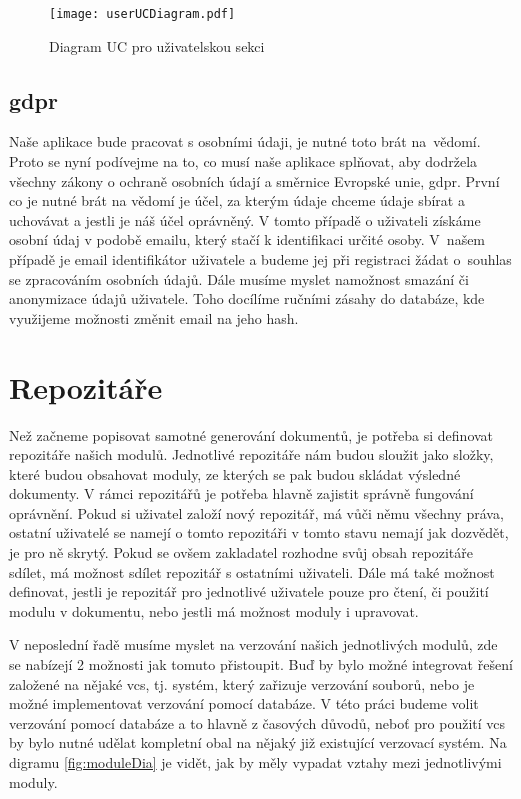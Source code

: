 \begin{figure}[h]
    \centering
    \texttt{[image: userUCDiagram.pdf]}
    \caption{Diagram UC pro uživatelskou sekci}
    \label{fig:userUCDiagram}
\end{figure}

\subsection{\gls{gdpr}}

Naše aplikace bude pracovat s osobními údaji, je nutné toto brát na~vědomí. Proto se nyní podívejme na to, co musí naše aplikace splňovat, aby dodržela všechny
zákony o ochraně osobních údají a směrnice Evropské unie, \gls{gdpr}. První co je nutné brát na vědomí je účel, za kterým údaje chceme údaje sbírat a uchovávat a jestli je náš
účel oprávněný. V tomto případě o uživateli získáme osobní údaj v podobě emailu, který stačí k identifikaci určité osoby. V~našem případě je email identifikátor uživatele
a budeme jej při registraci žádat o~\mbox{souhlas} se zpracováním osobních údajů. Dále musíme myslet na\linebreak možnost smazání či anonymizace údajů uživatele. Toho docílíme ručními
zá\-sahy do databáze, kde využijeme možnosti změnit email na jeho hash. \cite{gdpr}

\section{Repozitáře}

Než začneme popisovat samotné generování dokumentů, je potřeba si \mbox{definovat} repozitáře našich modulů. Jednotlivé repozitáře nám budou sloužit jako složky,
které budou obsahovat moduly, ze kterých se pak budou skládat výsledné dokumenty. V rámci repozitářů je potřeba hlavně zajistit správně fungování oprávnění.
Pokud si uživatel založí nový repozitář, má vůči němu všechny práva, ostatní uživatelé se namejí o tomto repozitáři v tomto stavu nemají jak dozvědět, je pro ně
skrytý. Pokud se ovšem zakladatel rozhodne svůj obsah repozitáře sdílet, má možnost sdílet repozitář s ostatními uživateli.
Dále má také možnost definovat, jestli je repozitář pro jednotlivé uživatele pouze pro čtení, či použití modulu v dokumentu,
nebo jestli má možnost moduly i upravovat.

V neposlední řadě musíme myslet na verzování našich jednotlivých modulů, zde se nabízejí 2 možnosti jak tomuto přistoupit. Buď by bylo možné integrovat
řešení založené na nějaké \gls{vcs}, tj. systém, který zařizuje verzování souborů,
nebo je možné implementovat verzování pomocí databáze. V této práci budeme volit verzování pomocí databáze a to hlavně z časových důvodů, neboť
pro použití \gls{vcs} by bylo nutné udělat kompletní obal na nějaký již existující verzovací systém. Na digramu \ref{fig:moduleDia} je vidět, jak by měly
vypadat vztahy mezi jednotlivými moduly.

